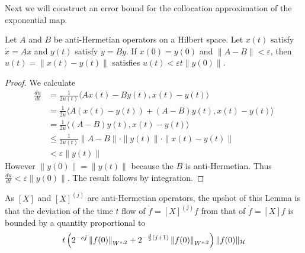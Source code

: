 Next we will construct an error bound for the collocation approximation of the exponential map.

\begin{lemma}
Let $A$ and $B$ be anti-Hermetian operators on a Hilbert space.  Let $x(t)$ satisfy $\dot{x} = Ax$ and $y(t)$ satisfy $\dot{y} = By$.  If $x(0) = y(0)$ and $\| A - B \| < \varepsilon$, then $u(t) = \| x(t) - y(t) \|$ satisfies $u(t) < \varepsilon t  \| y(0) \|$.
\end{lemma}

\begin{proof}
	We calculate
	\begin{align*}
		\frac{du}{dt} &= \frac{1}{2u(t)} \langle Ax(t) - By(t) , x(t) - y(t) \rangle \\
			&= \frac{1}{2u} \langle A(x(t)-y(t)) + (A-B) y(t) , x(t) - y(t) \rangle \\
			&= \frac{1}{2u} \langle (A-B)y(t) , x(t) - y(t) \rangle \\
			&\leq \frac{1}{2u(t)} \| A - B \| \cdot \| y(t) \| \cdot \| x(t) - y(t) \| \\
			&< \varepsilon \| y(t) \|
	\end{align*}
	However $\| y(0) \| = \| y(t)\|$ because the $B$ is anti-Hermetian.  Thus $\frac{du}{dt} < \varepsilon \| y(0)\|$.	The result follows by integration.
\end{proof}
As $[X]$ and $[X]^{(j)}$ are anti-Hermetian operators, the upshot of this Lemma is that the deviation of the time $t$ flow of $\dot{f} = [X]^{(j)} f$ from that of $\dot{f} = [X] f$ is bounded by a quantity proportional to
\[
 	t \left( 2^{-sj}\left\| f(0) \right\|_{W^{s,2}} + 2^{-\frac{d}{2}(j+1)}\left\| f(0) \right\|_{W^{s,2}} \right) \| f (0) \|_{\mathcal{H}}
\]
